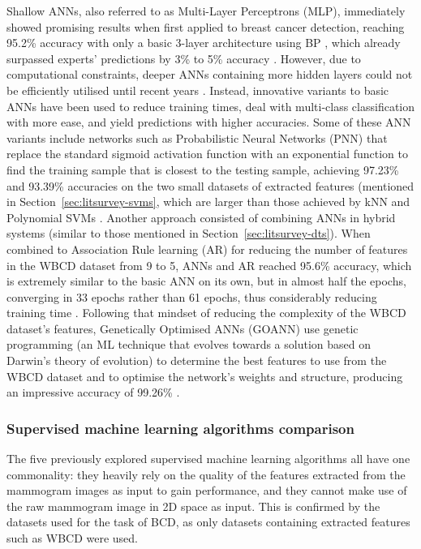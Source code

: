 Shallow ANNs, also referred to as Multi-Layer Perceptrons (MLP), immediately showed promising results when first applied to breast cancer detection, reaching 95.2\% accuracy with only a basic 3-layer architecture using BP \citep{Wu1993}, which already surpassed experts' predictions by 3\% to 5\% accuracy \citep{Yue2018}. However, due to computational constraints, deeper ANNs containing more hidden layers could not be efficiently utilised until recent years \citep{Litjens2017}. Instead, innovative variants to basic ANNs have been used to reduce training times, deal with multi-class classification with more ease, and yield predictions  with higher accuracies. Some of these ANN variants include networks such as Probabilistic Neural Networks (PNN) that replace the standard sigmoid activation function with an exponential function to find the training sample that is closest to the testing sample, achieving 97.23\% and 93.39\% accuracies on the two small datasets of extracted features (mentioned in Section~\ref{sec:litsurvey-svms}, which are larger than those achieved by kNN and Polynomial SVMs \citep{Osareh2010}. Another approach consisted of combining ANNs in hybrid systems (similar to those mentioned in Section~\ref{sec:litsurvey-dts}). When combined to Association Rule learning (AR) for reducing the number of features in the WBCD dataset from 9 to 5, ANNs and AR reached 95.6\% accuracy, which is extremely similar to the basic ANN on its own, but in almost half the epochs, converging in 33 epochs rather than 61 epochs, thus considerably reducing training time \citep{Karabatak2009}. Following that mindset of reducing the complexity of the WBCD dataset's features, Genetically Optimised ANNs (GOANN) use genetic programming (an ML technique that evolves towards a solution based on Darwin's theory of evolution) to determine the best features to use from the WBCD dataset and to optimise the network's weights and structure, producing an impressive accuracy of 99.26\% \citep{Bhardwaj2015}.

\subsubsection{Supervised machine learning algorithms comparison}

The five previously explored supervised machine learning algorithms all have one commonality: they heavily rely on the quality of the features extracted from the mammogram images as input to gain performance, and they cannot make use of the raw mammogram image in 2D space as input. This is confirmed by the datasets used for the task of BCD, as only datasets containing extracted features such as WBCD were used.\\

